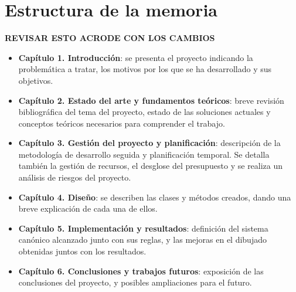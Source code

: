 \section{Estructura de la memoria}
\textbf{REVISAR ESTO ACRODE CON LOS CAMBIOS}
\begin{itemize}
    \item \textbf{Capítulo 1. Introducción}: se presenta el proyecto indicando la problemática a tratar, los motivos por los que se ha desarrollado y sus objetivos. 
    \item \textbf{Capítulo 2. Estado del arte y fundamentos teóricos}: breve revisión bibliográfica del tema del proyecto, estado de las soluciones actuales y conceptos teóricos necesarios para comprender el trabajo.
    \item \textbf{Capítulo 3. Gestión del proyecto y planificación}: descripción de la metodología de desarrollo seguida y planificación temporal. Se detalla también la gestión de recursos, el desglose del presupuesto y se realiza un análisis de riesgos del proyecto.
    \item \textbf{Capítulo 4. Diseño}: se describen las clases y métodos creados, dando una breve explicación de cada una de ellos.
    \item \textbf{Capítulo 5. Implementación y resultados}: definición del sistema canónico alcanzado junto con sus reglas, y las mejoras en el dibujado obtenidas juntos con los resultados.
    \item \textbf{Capítulo 6. Conclusiones y trabajos futuros}: exposición de las conclusiones del proyecto, y posibles ampliaciones para el futuro.
\end{itemize}
